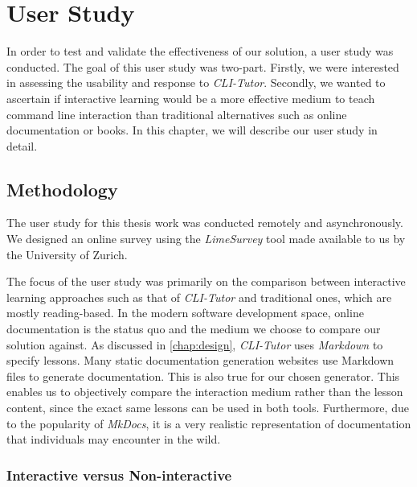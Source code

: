 \chapter{User Study}
\label{chap:userstudy}

In order to test and validate the effectiveness of our solution, a user study
was conducted. The goal of this user study was two-part. Firstly, we were
interested in assessing the usability and response to \textit{CLI-Tutor}.
Secondly, we wanted to ascertain if interactive learning would be a more
effective medium to teach command line interaction than traditional alternatives
such as online documentation or books. In this chapter, we will describe our
user study in detail.

\section{Methodology}

The user study for this thesis work was conducted remotely and asynchronously.
We designed an online survey using the \textit{LimeSurvey}\cite{schmitzlime}
tool made available to us by the University of Zurich.

The focus of the user study was primarily on the comparison between interactive
learning approaches such as that of \textit{CLI-Tutor} and traditional ones,
which are mostly reading-based. In the modern software development space,
online documentation is the status quo and the medium we choose to compare our
solution against. As discussed in \autoref{chap:design}, \textit{CLI-Tutor}
uses \textit{Markdown} to specify lessons. Many static documentation generation
websites use Markdown files to generate documentation. This is also true
for our chosen generator. This enables us to objectively compare the
interaction medium rather than the lesson content, since the exact same lessons
can be used in both tools. Furthermore, due to the popularity of
\textit{MkDocs}, it is a very realistic representation of documentation that
individuals may encounter in the wild.


\subsection{Interactive versus Non-interactive}

